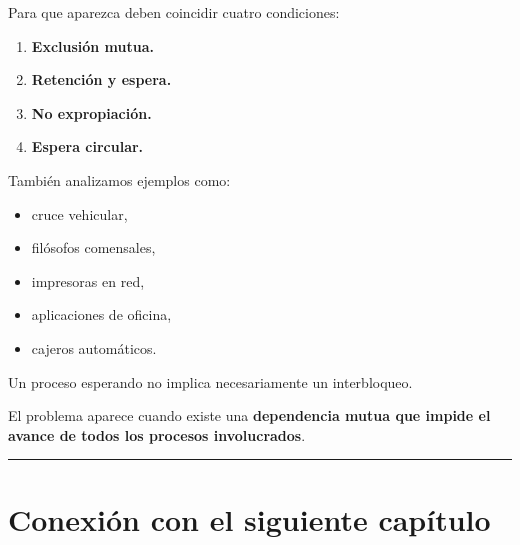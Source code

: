 \documentclass[
  spanish,
  letterpaper,
]{scrbook}
\providecommand{\tightlist}{%
  \setlength{\itemsep}{0pt}\setlength{\parskip}{0pt}}
\begin{document}
Para que aparezca deben coincidir cuatro condiciones:

\begin{enumerate}
\def\labelenumi{\arabic{enumi}.}
\tightlist
\item
  \textbf{Exclusión mutua.}
\item
  \textbf{Retención y espera.}
\item
  \textbf{No expropiación.}
\item
  \textbf{Espera circular.}
\end{enumerate}

También analizamos ejemplos como:

\begin{itemize}
\tightlist
\item
  cruce vehicular,
\item
  filósofos comensales,
\item
  impresoras en red,
\item
  aplicaciones de oficina,
\item
  cajeros automáticos.
\end{itemize}

\begin{tcolorbox}[enhanced jigsaw, arc=.35mm, bottomrule=.15mm, bottomtitle=1mm, breakable, colback=white, colbacktitle=quarto-callout-note-color!10!white, colframe=quarto-callout-note-color-frame, coltitle=black, left=2mm, leftrule=.75mm, opacityback=0, opacitybacktitle=0.6, rightrule=.15mm, title=\textcolor{quarto-callout-note-color}{\faInfo}\hspace{0.5em}{Para recordar}, titlerule=0mm, toprule=.15mm, toptitle=1mm]

Un proceso esperando no implica necesariamente un interbloqueo.

El problema aparece cuando existe una \textbf{dependencia mutua que
impide el avance de todos los procesos involucrados}.

\end{tcolorbox}

\begin{center}\rule{0.5\linewidth}{0.5pt}\end{center}


\chapter{Conexión con el siguiente
capítulo}\label{conexiuxf3n-con-el-siguiente-capuxedtulo-2}
\end{document}
